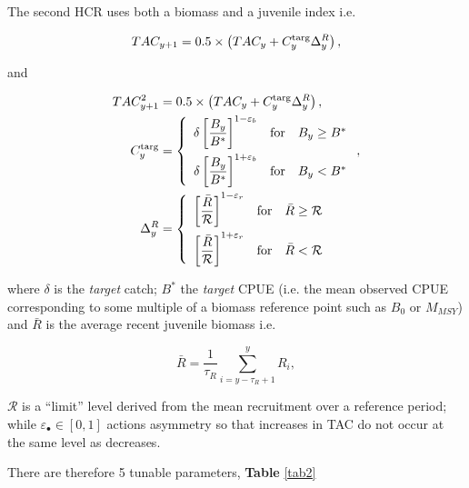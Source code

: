 \documentclass[%
nonumbib,      %
%
]{nrc1}                          %
\newcommand{\ds}{\displaystyle}
\newcommand{\veps}{\varepsilon}
\begin{document}
The second HCR uses both a biomass and a juvenile index i.e.

\begin{equation} 
 \begin{align*}
 \ds TAC_{y+1} &= 0.5\times\left(TAC_y+C^{\rm targ}_y\Delta^R_y\right),\\
 \end{align*}
  \end{equation}

and

 \begin{equation}
       \begin{align*}
            \ds TAC^2_{y+1} &= 0.5\times\left(TAC_y+C^{\rm targ}_y\Delta^R_y\right),\\
                \ds C^{\rm targ}_y &= \left\{\begin{array}{rcl}\ds{\delta \left[\frac{B_{y}}{B^*}\right]^{1-\veps_b}} & \mbox{for} & B_{y}\geq B^*\\[0.35cm]
\ds{\delta \left[\frac{B_{y}}{B^*}\right]^{1+\veps_b}} & \mbox{for} & B_{y}<B^*
    \end{array}\right.,\\
\ds \Delta^R_y &= \left\{\begin{array}{rcl}\ds{\left[\frac{\bar{R}}{\mathcal{R}}\right]^{1-\veps_r}} & \mbox{for} & \bar{R}\geq\mathcal{R}\\[0.35cm]
\ds{\left[\frac{\bar{R}}{\mathcal{R}}\right]^{1+\veps_r}} & \mbox{for} & \bar{R}<\mathcal{R}
\end{array}\right.
        \end{align*}
  \end{equation}

 where $\delta$ is the \textit{target} catch; $B^*$ the \textit{target} CPUE (i.e. the mean observed CPUE corresponding to some 
 multiple of a biomass reference point such as $B_0$ or $M_{MSY}$) and 
$\bar{R}$ is the average recent juvenile biomass i.e.

\begin{equation}
 \ds \bar{R}=\frac{1}{\tau_R}\sum\limits_{i=y-\tau_R+1}^{y}R_i,
 \end{equation}

 
$\mathcal{R}$ is a ``limit'' level derived from the mean recruitment over a reference period; \\
while $\veps_\bullet\in[0,1]$ actions asymmetry so that increases in TAC do not occur at the same level as decreases.

There are therefore 5 tunable parameters, \textbf{Table} \ref{tab2}
\end{document}

